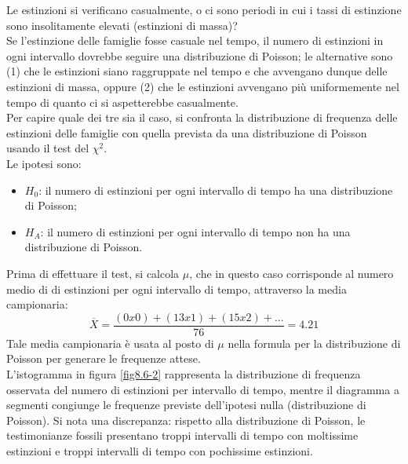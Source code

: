 \documentclass[drafts, 10pt]{book}
\newcounter{example}[section]
\begin{document}
\begin{example}
\begin{table}[H]
\begin{tabular}{c|c}
        \hline
        \end{tabular}
        \caption{}
        \label{tabestinzioni}
\end{table}\noindent
Le estinzioni si verificano casualmente, o ci sono periodi in cui i tassi di estinzione sono insolitamente elevati (estinzioni di massa)?
\\
Se l'estinzione delle famiglie fosse casuale nel tempo, il numero di estinzioni in ogni intervallo dovrebbe seguire una distribuzione di Poisson; le alternative sono (1) che le estinzioni siano raggruppate nel tempo e che avvengano dunque delle estinzioni di massa, oppure (2) che le estinzioni avvengano più uniformemente nel tempo di quanto ci si aspetterebbe casualmente.
\\
Per capire quale dei tre sia il caso, si confronta la distribuzione di frequenza delle estinzioni delle famiglie con quella prevista da una distribuzione di Poisson usando il test del $\chi^2$.
\\
Le ipotesi sono:
\begin{itemize}
    \item $H_0$: il numero di estinzioni per ogni intervallo di tempo ha una distribuzione di Poisson;
    \item $H_A$: il numero di estinzioni per ogni intervallo di tempo non ha una distribuzione di Poisson.
\end{itemize}
Prima di effettuare il test, si calcola $\mu$, che in questo caso corrisponde al numero medio di di estinzioni per ogni intervallo di tempo, attraverso la media campionaria:
\begin{equation}
\overline{X} = \frac{(0x0)+(13x1)+(15x2)+...}{76} = 4.21
\end{equation}
Tale media campionaria è usata al posto di $\mu$ nella formula per la distribuzione di Poisson per generare le frequenze attese.
\\
L'istogramma in figura \ref{fig8.6-2} rappresenta la distribuzione di frequenza osservata del numero di estinzioni per intervallo di tempo, mentre il diagramma a segmenti congiunge le frequenze previste dell'ipotesi nulla (distribuzione di Poisson).
Si nota una discrepanza: rispetto alla distribuzione di Poisson, le testimonianze fossili presentano troppi intervalli di tempo con moltissime estinzioni e troppi intervalli di tempo con pochissime estinzioni.

\end{example}
\end{document}

